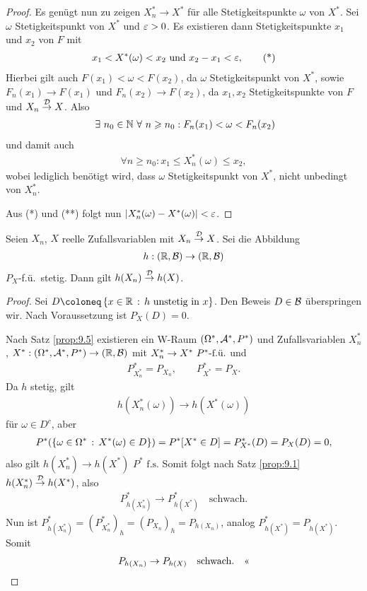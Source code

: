 \begin{proof}
Es genügt nun zu zeigen $X_n^*\to X^*$ für alle Stetigkeitspunkte $\omega$ von
$X^*$. Sei $\omega$ Stetigkeitspunkt von $X^*$ und $\ep > 0$. Es existieren
dann Stetigkeitspunkte $x_1$ und $x_2$ von $F$ mit
\begin{align*}
x_1< X^*(\omega) < x_2 \text{ und }x_2-x_1< \ep,\tag{*}
\end{align*}
Hierbei gilt auch $F(x_1)<\omega < F(x_2)$, da $\omega$ Stetigkeitspunkt von
$X^*$, sowie $F_n(x_1)\to F(x_1)$ und $F_n(x_2)\to F(x_2)$, da $x_1,x_2$
Stetigkeitspunkte von $F$ und $X_n\Dto X$. Also
\begin{align*}
\exists n_0\in\N \forall n\ge n_0 : F_n(x_1) < \omega < F_n(x_2)
\end{align*}
und damit auch
\begin{align*}
\forall n\ge n_0 : x_1\le X_n^*(\omega) \le x_2\tag{**},
\end{align*}
wobei lediglich benötigt wird, dass $\omega$ Stetigkeitspunkt von
$X^*$, nicht unbedingt von $X_n^*$.

Aus (*) und (**) folgt nun $\abs{X_n^*(\omega)-X^*(\omega)}<\ep$.\qedhere
\end{proof}

\begin{prop}
\label{prop:9.6}
Seien $X_{n}$, $X$ reelle Zufallsvariablen mit $X_{n}\Dto X$. Sei die Abbildung
\begin{align*}
h: (\R, {\BB}) \to (\R, {\BB})
\end{align*}
$P_{X}$-f.ü.\ stetig. Dann gilt $h(X_{n})\Dto h(X)$.\fishhere
\end{prop}

\begin{proof}
Sei $D\defl\setdef{x\in\R}{h\text{ unstetig in }x}$. Den Beweis $D\in\BB$
überspringen wir. Nach Voraussetzung ist $P_X(D)=0$.

Nach Satz \ref{prop:9.5} existieren ein W-Raum $(\Omega^*,\AA^*,P^*)$ und
Zufallsvariablen $X_n^*$, $X^* : (\Omega^*,\AA^*,P^*)\to (\R,\BB)$ mit
$X_n^*\to X^*\fu{P^*}$ und
\begin{align*}
P^*_{X_n^*} = P_{X_n},\qquad P^*_{X^*} = P_X.
\end{align*}
Da $h$ stetig, gilt
\begin{align*}
h(X_n^*(\omega)) \to h(X^*(\omega))
\end{align*}
für $\omega\in D^c$, aber
\begin{align*}
P^*(\setdef{\omega\in\Omega^*}{X^*(\omega)\in D}) = P^*[X^*\in D] =
P^*_{X^*}(D) = P_X(D) = 0,
\end{align*}
also gilt $h(X_n^*)\to h(X^*)$ $P^*\text{ f.s.}$ Somit folgt nach Satz
\ref{prop:9.1} $h(X_n^*)\Dto h(X^*)$, also
\begin{align*}
P^*_{h(X_n^*)}\to P^*_{h(X^*)}\quad \text{schwach}.
\end{align*}
Nun ist $P^*_{h(X_n^*)} = (P^*_{X_n^*})_h = (P_{X_n})_h = P_{h(X_n)}$, analog
$P^*_{h(X^*)} = P_{h(X^*)}$. Somit
\begin{align*}
P_{h(X_n)}\to P_{h(X)}\quad \text{schwach}.\qedhere
\end{align*}
\end{proof}

